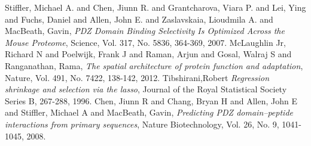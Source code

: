 \documentclass[a4paper, 12pt]{article}
\begin{document}
\newpage
\begin{thebibliography}{}
Stiffler, Michael A. and Chen, Jiunn R. and Grantcharova, Viara P. and Lei, Ying and Fuchs, Daniel and Allen, John E. and Zaslavskaia, Lioudmila A. and MacBeath, Gavin, \textit{PDZ Domain Binding Selectivity Is Optimized Across the Mouse Proteome}, Science, Vol. 317, No. 5836, 364-369, 2007.
McLaughlin Jr, Richard N and Poelwijk, Frank J and Raman, Arjun and Gosal, Walraj S and Ranganathan, Rama, \textit{The spatial architecture of protein function and adaptation}, Nature, Vol. 491, No. 7422, 138-142, 2012.
 Tibshirani,Robert \textit{Regression shrinkage and selection via the lasso}, Journal of the Royal Statistical Society Series B, 267-288, 1996.
Chen, Jiunn R and Chang, Bryan H and Allen, John E and Stiffler, Michael A and MacBeath, Gavin, \textit{Predicting PDZ domain--peptide interactions from primary sequences}, Nature Biotechnology, Vol. 26, No. 9, 1041-1045, 2008.
\end{thebibliography}
\end{document}
